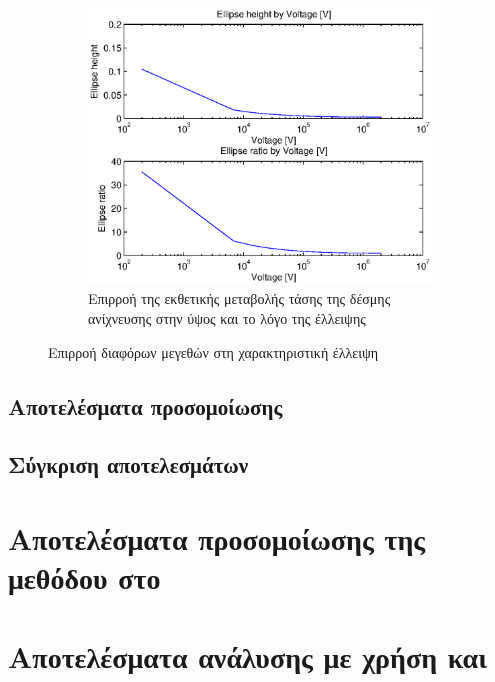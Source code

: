 \begin{figure}[tph]
\begin{subfigure}{0.45\textwidth}
		\label{fig:beam-deflection-script-06}
	\end{subfigure}
	\par\bigskip
	\begin{subfigure}{0.45\textwidth}
		\includegraphics[width=0.9\linewidth]{figures/beam-deflection-script-07}
		\centering
		\caption{Επιρροή της εκθετικής μεταβολής τάσης της δέσμης ανίχνευσης στην ύψος και το λόγο της έλλειψης}
		\label{fig:beam-deflection-script-07}
	\end{subfigure}
\caption{Επιρροή διαφόρων μεγεθών στη χαρακτηριστική έλλειψη}
\label{fig:beam-deflectoin}
\end{figure}

\subsection{Αποτελέσματα προσομοίωσης}

\subsection{Σύγκριση αποτελεσμάτων}

\section{Αποτελέσματα προσομοίωσης της μεθόδου στο }


\section{Αποτελέσματα ανάλυσης με χρήση  και }




